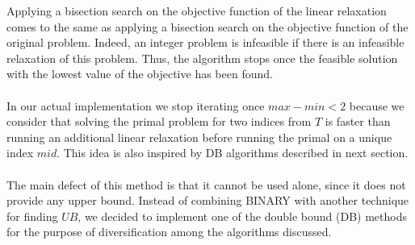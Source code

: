 \noindent Applying a bisection search on the objective function of the linear relaxation comes to the same as applying a bisection search
on the objective function of the original problem. Indeed, an integer problem is infeasible if there is an infeasible relaxation of this problem.
Thus, the algorithm stops once the feasible solution with the lowest value of the objective has been found. \\\\
In our actual implementation we stop iterating once $max - min < 2$ because we consider that solving the primal problem for two indices from $T$ is faster
than running an additional linear relaxation before running the primal on a unique index $mid$.
This idea is also inspired by DB algorithms described in next section.\\\\
The main defect of this method is that it cannot be used alone, since it does not provide any upper bound.
Instead of combining BINARY with another technique for finding $UB$, we decided to implement one of the
double bound (DB) methods for the purpose of diversification among the algorithms discussed.

